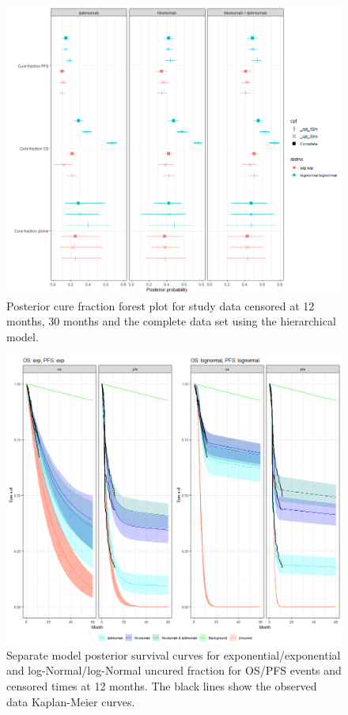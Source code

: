 \documentclass[AMA,STIX1COL]{WileyNJD-v2}
\begin{document}
\begin{figure}[!H]
\centering
\includegraphics[width=0.6\linewidth]{forest_plot_cf_hier_cpt.png}
\caption{\label{fig:forest_plot_cf_cutpoint_hier} Posterior cure fraction forest plot for study data censored at 12 months, 30 months and the complete data set using the hierarchical model.}
\end{figure}

\begin{figure}[!H]
\centering
\includegraphics[width=0.6\linewidth]{S_cp_12mo_exp_lognormal_sep.png}
\caption{\label{fig:S_cutpoint_12mo_sep} Separate model posterior survival curves for exponential/exponential and log-Normal/log-Normal uncured fraction for OS/PFS events and censored times at 12 months. The black lines show the observed data Kaplan-Meier curves.}
\end{figure}
\end{document}
